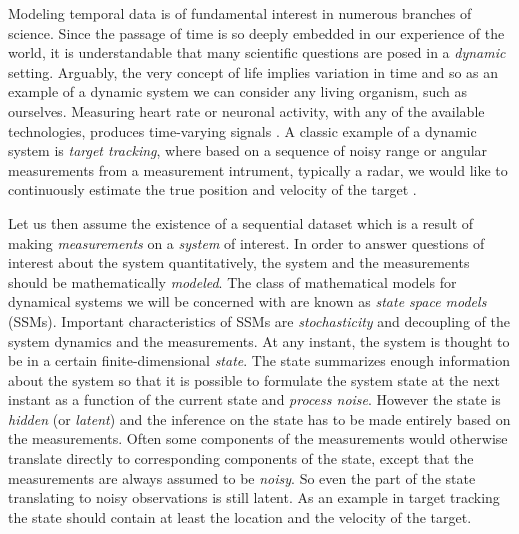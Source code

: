 Modeling temporal data is of fundamental interest in numerous branches of science.
Since the passage of time is so deeply embedded in our experience of the world, 
it is understandable that many scientific questions are posed in a \emph{dynamic}
setting. Arguably, the very concept of life implies variation in time and so 
as an example of a dynamic system we can consider any living organism, such as ourselves.
Measuring heart rate or neuronal activity, with any of the available technologies,
produces time-varying signals \parencite{Barbieri2006,Ergun2007}. A classic 
example of a dynamic
system is \emph{target tracking}, where based on a sequence of 
noisy range or angular measurements from a measurement intrument, typically a radar, 
we would like to continuously 
estimate the true position and velocity of the target \parencite{bar2004estimation,Godsill2007}. 


Let us then assume the existence of a sequential dataset which is a result of 
making \emph{measurements} on a \emph{system} of interest. In order to answer questions of interest
about the system quantitatively,
the system and the measurements should be mathematically \emph{modeled}. The class of mathematical
models for dynamical systems we will be concerned with are known as \emph{state space models} (SSMs).
Important characteristics of SSMs are \emph{stochasticity} and decoupling of the system dynamics and the
measurements. At any instant, the system is thought to be in a certain finite-dimensional \emph{state}. The state
summarizes enough information about the system so that it is possible to formulate the system
state at the next instant as a function of the current state and \emph{process noise}.  
However the state is \emph{hidden} (or \emph{latent}) and the inference on the state has 
to be made entirely based on the measurements.  Often some components of the measurements 
would otherwise translate directly to corresponding components of the state, except that 
the measurements are always assumed to be \emph{noisy}. So even the part of the state translating 
to noisy observations is still latent.
As an example in target tracking the state should contain at least the location and 
the velocity of the target. 

